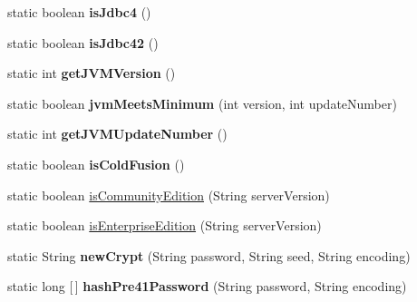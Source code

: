 \begin{DoxyCompactItemize}
\item 
\mbox{\label{classcom_1_1mysql_1_1jdbc_1_1_util_ab89f2b0eb8e68d8fc2f89377df7b05a6}} 
static boolean {\bfseries is\+Jdbc4} ()
\item 
\mbox{\label{classcom_1_1mysql_1_1jdbc_1_1_util_a3a0083c700e144ca2cd4c051a795b9b8}} 
static boolean {\bfseries is\+Jdbc42} ()
\item 
\mbox{\label{classcom_1_1mysql_1_1jdbc_1_1_util_a095a50ab6a96e7367b722acfd3fd595c}} 
static int {\bfseries get\+J\+V\+M\+Version} ()
\item 
\mbox{\label{classcom_1_1mysql_1_1jdbc_1_1_util_a5418d50fd9ec471e6b55b55fc41d23a7}} 
static boolean {\bfseries jvm\+Meets\+Minimum} (int version, int update\+Number)
\item 
\mbox{\label{classcom_1_1mysql_1_1jdbc_1_1_util_a9bd3ec1800f67dd4d1ad2a48438b5cdd}} 
static int {\bfseries get\+J\+V\+M\+Update\+Number} ()
\item 
\mbox{\label{classcom_1_1mysql_1_1jdbc_1_1_util_abb0e2e1094f9d212f27fa01de31f72f2}} 
static boolean {\bfseries is\+Cold\+Fusion} ()
\item 
static boolean \mbox{\hyperlink{classcom_1_1mysql_1_1jdbc_1_1_util_ab577aaf14859ab359307da29c26bff32}{is\+Community\+Edition}} (String server\+Version)
\item 
static boolean \mbox{\hyperlink{classcom_1_1mysql_1_1jdbc_1_1_util_a0baaeeb5b7526fe807869f6941b77a27}{is\+Enterprise\+Edition}} (String server\+Version)
\item 
\mbox{\label{classcom_1_1mysql_1_1jdbc_1_1_util_a1863ffe8385df0ad0c24a8f40b2334b2}} 
static String {\bfseries new\+Crypt} (String password, String seed, String encoding)
\item 
\mbox{\label{classcom_1_1mysql_1_1jdbc_1_1_util_a970940dafe64cb6bfab39f0d5cc1909e}} 
static long \mbox{[}$\,$\mbox{]} {\bfseries hash\+Pre41\+Password} (String password, String encoding)

\end{DoxyCompactItemize}
